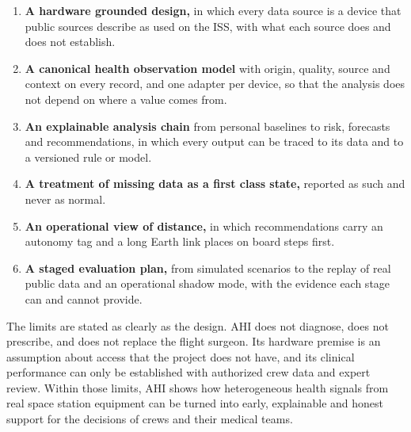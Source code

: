 \begin{enumerate}
\item \textbf{A hardware grounded design,} in which every data source is a device that public sources describe as used on the ISS, with what each source does and does not establish.
\item \textbf{A canonical health observation model} with origin, quality, source and context on every record, and one adapter per device, so that the analysis does not depend on where a value comes from.
\item \textbf{An explainable analysis chain} from personal baselines to risk, forecasts and recommendations, in which every output can be traced to its data and to a versioned rule or model.
\item \textbf{A treatment of missing data as a first class state,} reported as such and never as normal.
\item \textbf{An operational view of distance,} in which recommendations carry an autonomy tag and a long Earth link places on board steps first.
\item \textbf{A staged evaluation plan,} from simulated scenarios to the replay of real public data and an operational shadow mode, with the evidence each stage can and cannot provide.
\end{enumerate}

The limits are stated as clearly as the design. AHI does not diagnose, does not prescribe, and does not replace the flight surgeon. Its hardware premise is an assumption about access that the project does not have, and its clinical performance can only be established with authorized crew data and expert review. Within those limits, AHI shows how heterogeneous health signals from real space station equipment can be turned into early, explainable and honest support for the decisions of crews and their medical teams.

